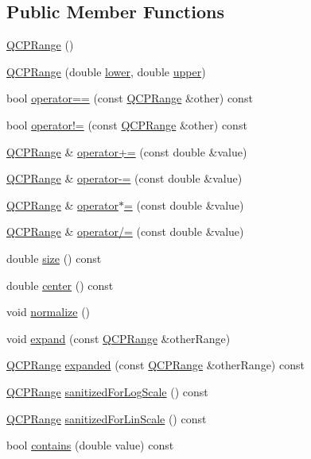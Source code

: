 \subsection*{Public Member Functions}
\begin{DoxyCompactItemize}
\item 
\hyperlink{class_q_c_p_range_aca158d7e69702cee5d77d10a269b01e2}{Q\+C\+P\+Range} ()
\item 
\hyperlink{class_q_c_p_range_a1d9d84d084c8f368fdedd42e0978d405}{Q\+C\+P\+Range} (double \hyperlink{class_q_c_p_range_aa3aca3edb14f7ca0c85d912647b91745}{lower}, double \hyperlink{class_q_c_p_range_ae44eb3aafe1d0e2ed34b499b6d2e074f}{upper})
\item 
bool \hyperlink{class_q_c_p_range_aa20f91509687505e25bd2ef10d2f0e15}{operator==} (const \hyperlink{class_q_c_p_range}{Q\+C\+P\+Range} \&other) const 
\item 
bool \hyperlink{class_q_c_p_range_a9b9016ee83dea60573abb9a5ef4cdbcb}{operator!=} (const \hyperlink{class_q_c_p_range}{Q\+C\+P\+Range} \&other) const 
\item 
\hyperlink{class_q_c_p_range}{Q\+C\+P\+Range} \& \hyperlink{class_q_c_p_range_afea7c1aa7d08f061cd9bd8832f957df8}{operator+=} (const double \&value)
\item 
\hyperlink{class_q_c_p_range}{Q\+C\+P\+Range} \& \hyperlink{class_q_c_p_range_a95894bcb15a16a75ca564091374e2191}{operator-\/=} (const double \&value)
\item 
\hyperlink{class_q_c_p_range}{Q\+C\+P\+Range} \& \hyperlink{class_q_c_p_range_a6876aa9620ff2f0f7f1873f998372cef}{operator$\ast$=} (const double \&value)
\item 
\hyperlink{class_q_c_p_range}{Q\+C\+P\+Range} \& \hyperlink{class_q_c_p_range_a6137d8682b6835ace840730b4c1e2d63}{operator/=} (const double \&value)
\item 
double \hyperlink{class_q_c_p_range_afa57c13049b965edb6fd1c00ac56338a}{size} () const 
\item 
double \hyperlink{class_q_c_p_range_a3825b53cf17da5de0843c1f3baad07db}{center} () const 
\item 
void \hyperlink{class_q_c_p_range_af914a7740269b0604d0827c634a878a9}{normalize} ()
\item 
void \hyperlink{class_q_c_p_range_a0fa1bc8048be50d52bea93a8caf08305}{expand} (const \hyperlink{class_q_c_p_range}{Q\+C\+P\+Range} \&other\+Range)
\item 
\hyperlink{class_q_c_p_range}{Q\+C\+P\+Range} \hyperlink{class_q_c_p_range_a6437bdf29a7ebc2c88a6045c4e622384}{expanded} (const \hyperlink{class_q_c_p_range}{Q\+C\+P\+Range} \&other\+Range) const 
\item 
\hyperlink{class_q_c_p_range}{Q\+C\+P\+Range} \hyperlink{class_q_c_p_range_aaf6a9046e78d91eeb8e89584fe46b034}{sanitized\+For\+Log\+Scale} () const 
\item 
\hyperlink{class_q_c_p_range}{Q\+C\+P\+Range} \hyperlink{class_q_c_p_range_a1ff029704c29a75adbc1dc36cecaf44c}{sanitized\+For\+Lin\+Scale} () const 
\item 
bool \hyperlink{class_q_c_p_range_a030ce95b527c32e01414d0351347b46d}{contains} (double value) const 
\end{DoxyCompactItemize}

